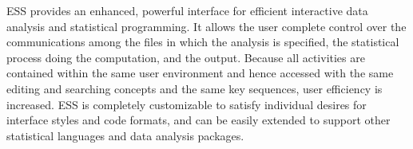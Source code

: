 \documentclass{article}
\newcommand*{\SAS}{\textsc{SAS}}
\begin{document}
ESS provides an enhanced, powerful interface for efficient interactive
data analysis and statistical programming.  It allows the user
complete control over the communications among the files in which the
analysis is specified, the statistical process doing the computation,
and the output.  Because all activities are contained within the same
user environment and hence accessed with the same editing and
searching concepts and the same key sequences, user efficiency is
increased.  ESS is completely customizable to satisfy individual
desires for interface styles and code formats, and can be easily
extended to support other statistical languages and data analysis
packages.




\end{document}
